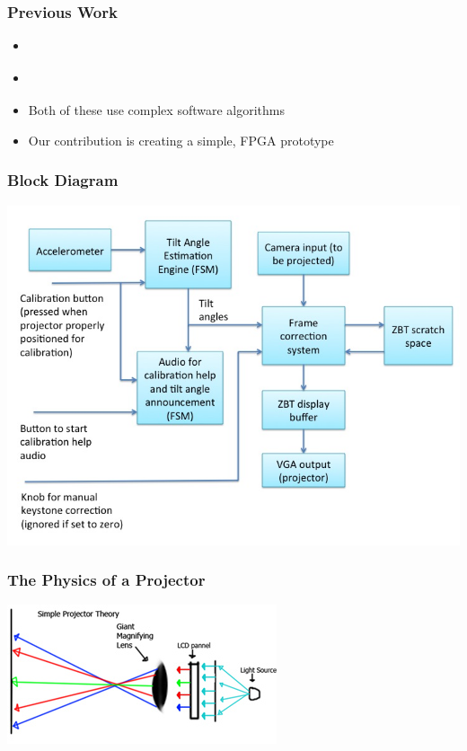 \documentclass{beamer}
\begin{document}
\begin{frame}
\frametitle{Previous Work}
\begin{itemize}
\item \citet{raskar2001self}
\item \citet{sukthankar2001smarter}
\item Both of these use complex software algorithms
\pause
\item Our contribution is creating a simple, FPGA prototype
\end{itemize}
\end{frame}

\begin{frame}
\frametitle{Block Diagram}
\includegraphics[width=\textwidth]{./img/block_diag}
\end{frame}

\begin{frame}
\frametitle{The Physics of a Projector}
\includegraphics[height=0.5\textheight]{./img/projector_physics}
\end{frame}
\end{document}
